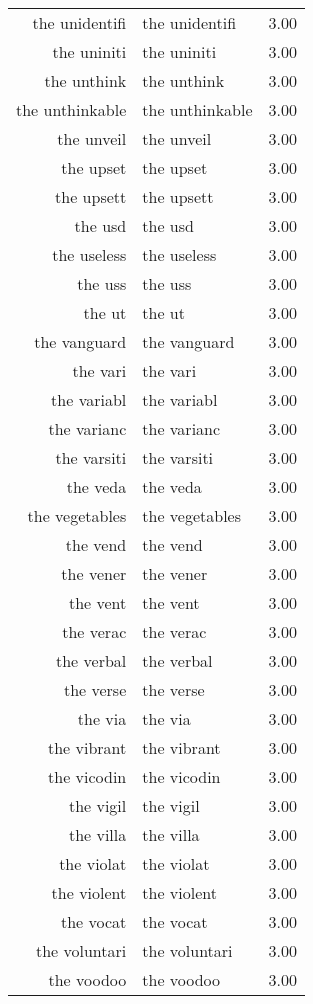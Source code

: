 \begin{table}[ht]
\begin{tabular}{rlr}
  the unidentifi & the unidentifi & 3.00 \\ 
  the uniniti & the uniniti & 3.00 \\ 
  the unthink & the unthink & 3.00 \\ 
  the unthinkable & the unthinkable & 3.00 \\ 
  the unveil & the unveil & 3.00 \\ 
  the upset & the upset & 3.00 \\ 
  the upsett & the upsett & 3.00 \\ 
  the usd & the usd & 3.00 \\ 
  the useless & the useless & 3.00 \\ 
  the uss & the uss & 3.00 \\ 
  the ut & the ut & 3.00 \\ 
  the vanguard & the vanguard & 3.00 \\ 
  the vari & the vari & 3.00 \\ 
  the variabl & the variabl & 3.00 \\ 
  the varianc & the varianc & 3.00 \\ 
  the varsiti & the varsiti & 3.00 \\ 
  the veda & the veda & 3.00 \\ 
  the vegetables & the vegetables & 3.00 \\ 
  the vend & the vend & 3.00 \\ 
  the vener & the vener & 3.00 \\ 
  the vent & the vent & 3.00 \\ 
  the verac & the verac & 3.00 \\ 
  the verbal & the verbal & 3.00 \\ 
  the verse & the verse & 3.00 \\ 
  the via & the via & 3.00 \\ 
  the vibrant & the vibrant & 3.00 \\ 
  the vicodin & the vicodin & 3.00 \\ 
  the vigil & the vigil & 3.00 \\ 
  the villa & the villa & 3.00 \\ 
  the violat & the violat & 3.00 \\ 
  the violent & the violent & 3.00 \\ 
  the vocat & the vocat & 3.00 \\ 
  the voluntari & the voluntari & 3.00 \\ 
  the voodoo & the voodoo & 3.00 \\ 

\end{tabular}
\end{table}
